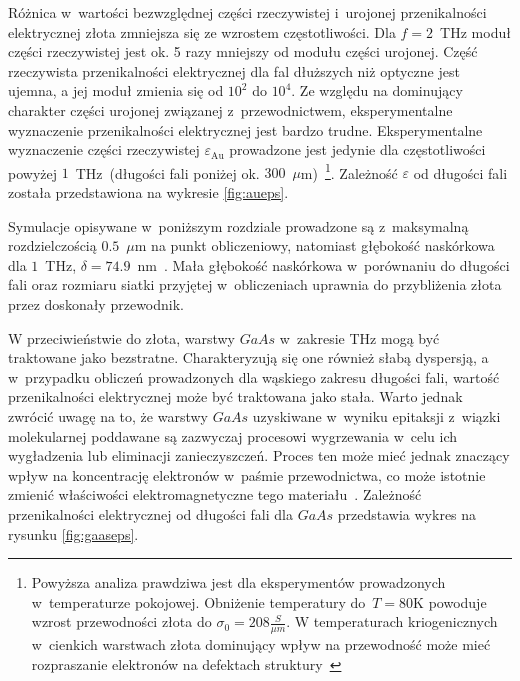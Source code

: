 Różnica w~wartości bezwzględnej części rzeczywistej i~urojonej przenikalności elektrycznej złota zmniejsza się ze wzrostem częstotliwości. Dla $f=2$~THz moduł części rzeczywistej jest ok. 5 razy mniejszy od modułu części urojonej. Część rzeczywista przenikalności elektrycznej dla fal dłuższych niż optyczne jest ujemna, a jej moduł zmienia się od $10^2$ do $10^4$. Ze względu na dominujący charakter części urojonej związanej z~przewodnictwem, eksperymentalne wyznaczenie przenikalności elektrycznej jest bardzo trudne. Eksperymentalne wyznaczenie części rzeczywistej $\varepsilon_{\textrm{Au}}$ prowadzone jest jedynie dla częstotliwości powyżej $1$~THz~(długości fali poniżej ok. $300$~$\mu$m)~\cite{ordal1983optical}\footnote{Powyższa analiza prawdziwa jest dla eksperymentów prowadzonych w~temperaturze pokojowej. Obniżenie temperatury do~$T=$80K powoduje wzrost przewodności złota do $\sigma_0=208\frac{S}{\mu m}$. W temperaturach kriogenicznych w~cienkich warstwach złota dominujący wpływ na przewodność może mieć rozpraszanie elektronów na defektach struktury~\cite{lide2009crc}}. Zależność $\varepsilon$ od długości fali została przedstawiona na wykresie \ref{fig:aueps}. 

Symulacje opisywane w~poniższym rozdziale prowadzone są z~maksymalną rozdzielczością $0.5$~$\mu$m na punkt obliczeniowy, natomiast głębokość naskórkowa dla $1$~THz, $\delta=74.9$~nm~\cite{lee2009principles}. Mała głębokość naskórkowa w~porównaniu do długości fali oraz rozmiaru siatki przyjętej w~obliczeniach uprawnia do przybliżenia złota przez doskonały przewodnik. 

W przeciwieństwie do złota, warstwy $GaAs$ w~zakresie THz mogą być traktowane jako bezstratne. Charakteryzują się one również słabą dyspersją, a w~przypadku obliczeń prowadzonych dla wąskiego zakresu długości fali, wartość przenikalności elektrycznej może być traktowana jako stała. Warto jednak zwrócić uwagę na to, że warstwy $GaAs$ uzyskiwane w~wyniku epitaksji z~wiązki molekularnej poddawane są zazwyczaj procesowi wygrzewania w~celu ich wygładzenia lub eliminacji zanieczyszczeń. Proces ten może mieć jednak znaczący wpływ na koncentrację elektronów w~paśmie przewodnictwa, co może istotnie zmienić właściwości elektromagnetyczne tego materiału~\cite{zhang2009annealing}. Zależność przenikalności elektrycznej od długości fali dla $GaAs$ przedstawia wykres na rysunku \ref{fig:gaaseps}.


